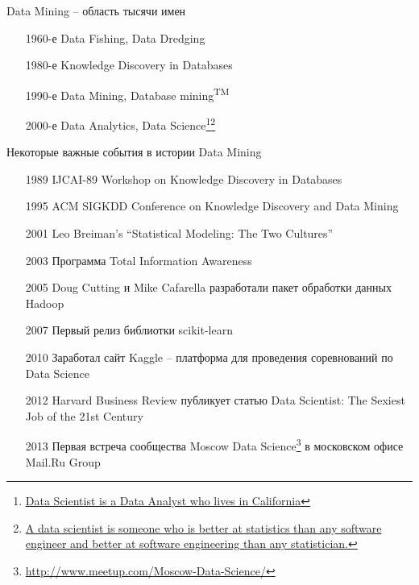 \documentclass[aspectratio=169]{beamer}
\begin{document}
\begin{frame}{Data Mining -- область тысячи имен}

\begin{enumerate}
\item[1960-е] Data Fishing, Data Dredging
\item[1980-е] Knowledge Discovery in Databases
\item[1990-е] Data Mining, Database mining\textsuperscript{TM}
\item[2000-е] Data Analytics, Data Science\footnote{\href{https://twitter.com/nivertech/status/180109930139893761}{Data Scientist is a Data Analyst who lives in California}}\footnote{\href{https://twitter.com/josh_wills/status/198093512149958656}{A data scientist is someone who is better at statistics than any software engineer and better at software engineering than any statistician.}}
\end{enumerate}

\end{frame}

\begin{frame}{Некоторые важные события в истории Data Mining}

\begin{enumerate}
\item[1989] IJCAI-89 Workshop on Knowledge Discovery in Databases 
\item[1995] ACM SIGKDD Conference on Knowledge Discovery and Data Mining
\item[2001] Leo Breiman's ``Statistical Modeling: The Two Cultures''
\item[2003] Программа Total Information Awareness
\item[2005] Doug Cutting и Mike Cafarella разработали пакет обработки данных Hadoop
\item[2007] Первый релиз библиотки scikit-learn
\item[2010] Заработал сайт Kaggle -- платформа для проведения соревнований по Data Science
\item[2012] Harvard Business Review публикует статью Data Scientist: The Sexiest Job of the 21st Century
\item[2013] Первая встреча сообщества Moscow Data Science\footnote{\url{http://www.meetup.com/Moscow-Data-Science/}} в московском офисе Mail.Ru Group
\end{enumerate}

\end{frame}
\end{document}
